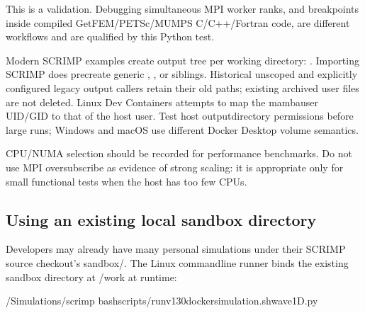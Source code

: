 \documentclass[letterpaper,10pt,english]{sphinxmanual}
\begin{document}
\sphinxAtStartPar
This is a  validation. Debugging
simultaneous MPI worker ranks, and breakpoints inside compiled
GetFEM/PETSc/MUMPS C/C++/Fortran code, are different workflows
and are  qualified by this Python test.

\sphinxAtStartPar
Modern SCRIMP examples create  output tree per working
directory: .
Importing SCRIMP does  pre\sphinxhyphen{}create generic
, , 
or  siblings. Historical unscoped 
and explicitly configured legacy output callers retain
their old paths; existing archived user files are not deleted.
Linux Dev Containers attempts to map the mambauser UID/GID to that
of the host user. Test host output\sphinxhyphen{}directory permissions before
large runs; Windows and macOS use different Docker Desktop volume
semantics.

\sphinxAtStartPar
CPU/NUMA selection should be recorded for performance benchmarks.
Do not use MPI \textendash{}oversubscribe as evidence of strong scaling: it is
appropriate only for small functional tests when the host has too
few CPUs.


\subsection{Using an existing local sandbox directory}
\label{\detokenize{vscode:using-an-existing-local-sandbox-directory}}
\sphinxAtStartPar
Developers may already have many personal simulations under their
SCRIMP source checkout’s sandbox/.  The Linux command\sphinxhyphen{}line runner binds the existing
sandbox directory at /work at runtime:

\begin{sphinxVerbatim}[commandchars=\\\{\}]
\PYGZti{}/Simulations/scrimp
bashscripts/run\PYGZhy{}v130\PYGZhy{}docker\PYGZhy{}simulation.shwave\PYGZus{}1D.py
\end{sphinxVerbatim}
\end{document}
